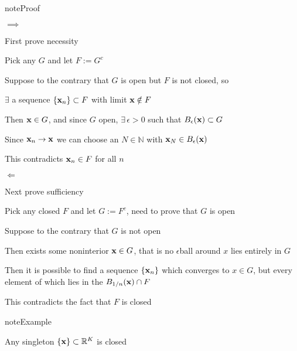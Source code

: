 \documentclass[letterpaper,10pt,english]{jupyterBook}
\begin{document}
\begin{sphinxadmonition}{note}{Proof}

\sphinxAtStartPar
\(\implies\)

\sphinxAtStartPar
First prove necessity

\sphinxAtStartPar
Pick any \(G\) and let \(F := G^c\)

\sphinxAtStartPar
Suppose to the contrary that \(G\) is open but \(F\) is not closed, so

\sphinxAtStartPar
\(\exists\) a sequence \(\{{\bf x}_n\} \subset F\) with limit \({\bf x} \notin F\)

\sphinxAtStartPar
Then \({\bf x} \in G\), and since \(G\) open, \(\exists \, \epsilon > 0\) such
that \(B_\epsilon({\bf x}) \subset G\)

\sphinxAtStartPar
Since \({\bf x}_n \to {\bf x}\) we can choose an \(N \in \mathbb{N}\) with \({\bf x}_N \in
B_\epsilon({\bf x})\)

\sphinxAtStartPar
This contradicts \({\bf x}_n \in F\) for all \(n\)

\sphinxAtStartPar
\(\Longleftarrow\)

\sphinxAtStartPar
Next prove sufficiency

\sphinxAtStartPar
Pick any closed \(F\) and let \(G := F^c\), need to prove that \(G\) is open

\sphinxAtStartPar
Suppose to the contrary that \(G\) is not open

\sphinxAtStartPar
Then exists some non\sphinxhyphen{}interior \({\bf x} \in G\), that is no \(\epsilon\)\sphinxhyphen{}ball around \(x\) lies entirely in \(G\)

\sphinxAtStartPar
Then it is possible to find a sequence \(\{{\bf x}_n\}\) which converges to \(x \in G\), but every element of which lies in the \(B_{1/n}({\bf x}) \cap F\)

\sphinxAtStartPar
This contradicts the fact that \(F\) is closed
\end{sphinxadmonition}

\begin{sphinxadmonition}{note}{Example}

\sphinxAtStartPar
Any singleton \(\{ {\bf x} \} \subset \mathbb{R}^K\) is closed
\end{sphinxadmonition}
\end{document}
